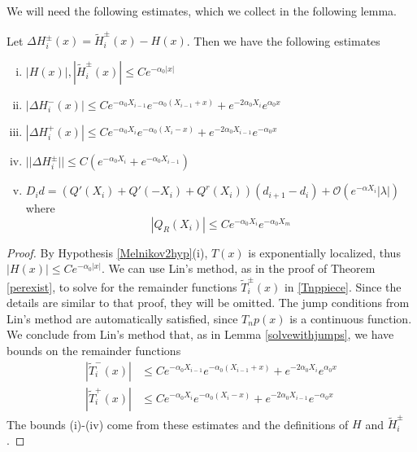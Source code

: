 \documentclass[thesis.tex]{subfiles}
\begin{document}
We will need the following estimates, which we collect in the following lemma.
\begin{lemma}\label{stabestimates}
Let $\Delta H_i^\pm(x) = \tilde{H}_i^\pm(x) - H(x)$. Then we have the following estimates
\begin{enumerate}[(i)]
\item $|H(x)|, |\tilde{H}_i^\pm(x)| \leq C e^{-\alpha_0 |x|}$
\item $|\Delta H_i^-(x)| \leq C e^{-\alpha_0 X_{i-1}} e^{-\alpha_0(X_{i-1} + x) } + e^{-2 \alpha_0 X_i} e^{\alpha_0 x}$
\item $|\Delta H_i^+(x)| \leq C e^{-\alpha_0 X_i} e^{-\alpha_0(X_i - x) } + e^{-2 \alpha_0 X_{i-1}} e^{-\alpha_0 x}$
\item $||\Delta H_i^\pm|| \leq C(e^{-\alpha_0 X_i} + e^{-\alpha_0 X_{i-1}} )$ 
\item $D_i d = ( Q'(X_i) + Q'(-X_i) + Q^r(X_i))(d_{i+1} - d_i ) + \mathcal{O} ( e^{-\alpha X_i} |\lambda| )$
where
\[
|Q_R(X_i)| \leq C e^{-\alpha_0 X_i} e^{-\alpha_0 X_m}
\]
\end{enumerate}
\begin{proof}
By Hypothesis \ref{Melnikov2hyp}(i), $T(x)$ is exponentially localized, thus $|H(x)| \leq C e^{-\alpha_0 |x|}$. We can use Lin's method, as in the proof of Theorem \ref{perexist}, to solve for the remainder functions $\tilde{T}_i^\pm(x)$ in \eqref{Tnppiece}. Since the details are similar to that proof, they will be omitted. The jump conditions from Lin's method are automatically satisfied, since $T_np(x)$ is a continuous function. We conclude from Lin's method that, as in Lemma \ref{solvewithjumps}, we have bounds on the remainder functions
\begin{align*}
|\tilde{T}_i^-(x)| &\leq C e^{-\alpha_0 X_{i-1}} e^{-\alpha_0(X_{i-1} + x) } + e^{-2 \alpha_0 X_i} e^{\alpha_0 x} \\
|\tilde{T}_i^+(x)| &\leq C e^{-\alpha_0 X_i} e^{-\alpha_0(X_i - x) } + e^{-2 \alpha_0 X_{i-1}} e^{-\alpha_0 x}
\end{align*}
The bounds (i)-(iv) come from these estimates and the definitions of $H$ and $\tilde{H}_i^\pm$.


\end{proof}
\end{lemma}
\end{document}
